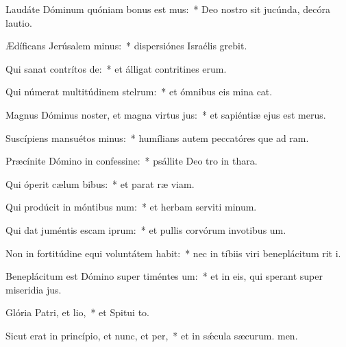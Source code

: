 \item Laudáte Dóminum quóniam bonus est mus:~* Deo nostro sit jucúnda, decóra lautio.
\item Ædíficans Jerúsalem minus:~* dispersiónes Israélis grebit.
\item Qui sanat contrítos de:~* et álligat contritines erum.
\item Qui númerat multitúdinem stelrum:~* et ómnibus eis mina cat.
\item Magnus Dóminus noster, et magna virtus jus:~* et sapiéntiæ ejus  est merus.
\item Suscípiens mansuétos minus:~* humílians autem peccatóres que ad ram.
\item Præcínite Dómino in confessine:~* psállite Deo tro in thara.
\item Qui óperit cælum bibus:~* et parat ræ viam.
\item Qui prodúcit in móntibus num:~* et herbam serviti minum.
\item Qui dat juméntis escam iprum:~* et pullis corvórum invotibus um.
\item Non in fortitúdine equi voluntátem habit:~* nec in tíbiis viri beneplácitum rit i.
\item Beneplácitum est Dómino super timéntes um:~* et in eis, qui sperant super miseridia jus.
\item Glória Patri, et lio,~* et Spitui to.
\item Sicut erat in princípio, et nunc, et per,~* et in sǽcula sæcurum. men.
